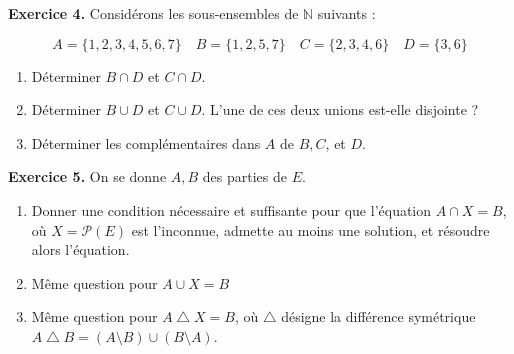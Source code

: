 \documentclass[a4paper, 10pt]{report}
\begin{document}
	\vspace{5mm}
	\noindent
	\textbf{Exercice 4.} Considérons les sous-ensembles de
	$\mathbb{N}$ suivants :
	
	\[
		A = \{1, 2, 3, 4, 5, 6, 7\} \quad
		B = \{1, 2, 5, 7\} \quad
		C = \{2, 3, 4, 6\} \quad
		D = \{3, 6\}
	\]
	
	\begin{enumerate}[label=\arabic*.]
		\item Déterminer $B \cap D$ et $C \cap D$.
		\item Déterminer $B \cup D$ et $C \cup D$. L'une de ces deux
		unions est-elle disjointe ?
		\item Déterminer les complémentaires dans $A$ de $B, C$, et $D$.
	\end{enumerate}
	
	\vspace{5mm}
	\noindent
	{\color{red}\textbf{Exercice 5.}}
	On se donne  $A, B$ des parties de $E$.
	
	\begin{enumerate}[label=\arabic*.]
		\item Donner une condition nécessaire et suffisante pour que
		l'équation $A \cap X = B$, où $X = \mathcal{P}(E)$ est
		l'inconnue, admette au moins une solution, et résoudre alors
		l'équation.
		\item Même question pour $A \cup X = B$
		\item Même question pour $A \bigtriangleup X = B$, où
		$\bigtriangleup$ désigne la différence symétrique
		$A \bigtriangleup B = (A \setminus B) \cup (B \setminus A)$.
	\end{enumerate}
\end{document}
